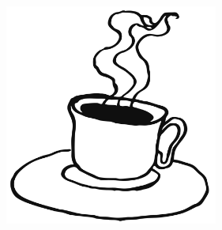 %

\begin{figure}[!b]
\begin{center}
\includegraphics[width=7cm]{../bilder/fardigabilder/BilderTillKapitel/kaffe.png} 
\end{center}
\end{figure}
\clearpage

\clearpage


%
\clearpage

\clearpage

\clearpage

\clearpage

%
%
\clearpage


